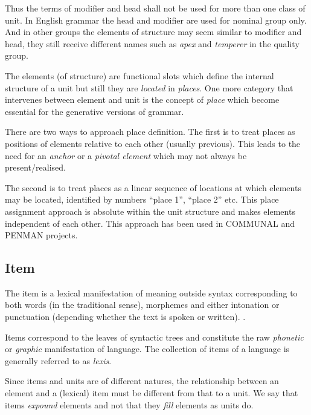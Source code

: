 Thus the terms of modifier and head shall not be used for more than one class of unit. In English grammar the head and modifier are used for nominal group only. And in other groups the elements of structure may seem similar to modifier and head, they still receive different names such as \textit{apex} and \textit{temperer} in the quality group.

The elements (of structure) are functional slots which define the internal structure of a unit but still they are \textit{located} in \textit{places}. One more category that intervenes between element and unit is the concept of \textit{place} which become essential for the generative versions of grammar.

There are two ways to approach place definition. The first is to treat places as positions of elements relative to each other (usually previous). This leads to the need for an \textit{anchor} or a \textit{pivotal element} which may not always be present/realised.

The second is to treat places as a linear sequence of locations at which elements may be located, identified by numbers ``place 1'', ``place 2'' etc. This place assignment approach is absolute within the unit structure and makes elements independent of each other. This approach has been used in COMMUNAL \citep{Fawcett90-communal} and PENMAN \citep{PenmanOverview} projects. 

\subsection{Item}
\begin{definition}[Item]\label{def:item}
	The item is a lexical manifestation of meaning outside syntax corresponding to both words (in the traditional sense), morphemes and either intonation or punctuation (depending whether the text is spoken or written). \citep[226--232]{Fawcett2000}. 
\end{definition}

Items correspond to the leaves of syntactic trees and constitute the raw \textit{phonetic} or \textit{graphic} manifestation of language. The collection of items of a language is generally referred to as \textit{lexis}.

Since items and units are of different natures, the relationship between an element and a (lexical) item must be different from that to a unit. We say that items \textit{expound} elements and not that they \textit{fill} elements as units do. 

